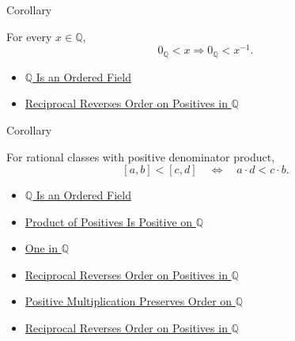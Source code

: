\begin{corollarybox}{Corollary}
\begin{corollary}
\label{cor:positive-rationals-have-positive-inverses}
For every $x\in\mathbb{Q}$,
\[
0_{\mathbb{Q}}<x
\Longrightarrow
0_{\mathbb{Q}}<x^{-1}.
\]
\end{corollary}
\end{corollarybox}

\begin{dependencies}
\begin{itemize}
  \item \hyperref[thm:q-is-an-ordered-field]{$\mathbb{Q}$ Is an Ordered Field}
  \item \hyperref[thm:reciprocal-reverses-order-on-positives-q]{Reciprocal Reverses Order on Positives in $\mathbb{Q}$}
\end{itemize}
\end{dependencies}

\begin{corollarybox}{Corollary}
\begin{corollary}
\label{cor:fraction-comparison-on-q}
For rational classes with positive denominator product,
\[
[a,b]<[c,d]
\quad\Longleftrightarrow\quad
a\cdot d<c\cdot b.
\]
\end{corollary}
\end{corollarybox}

\begin{dependencies}
\begin{itemize}
  \item \hyperref[thm:q-is-an-ordered-field]{$\mathbb{Q}$ Is an Ordered Field}
  \item \hyperref[prop:product-of-positives-is-positive-q]{Product of Positives Is Positive on $\mathbb{Q}$}
  \item \hyperref[def:one-in-q]{One in $\mathbb{Q}$}
  \item \hyperref[thm:reciprocal-reverses-order-on-positives-q]{Reciprocal Reverses Order on Positives in $\mathbb{Q}$}
  \item \hyperref[thm:positive-multiplication-preserves-order-on-q]{Positive Multiplication Preserves Order on $\mathbb{Q}$}
  \item \hyperref[thm:reciprocal-reverses-order-on-positives-q]{Reciprocal Reverses Order on Positives in $\mathbb{Q}$}
\end{itemize}
\end{dependencies}
